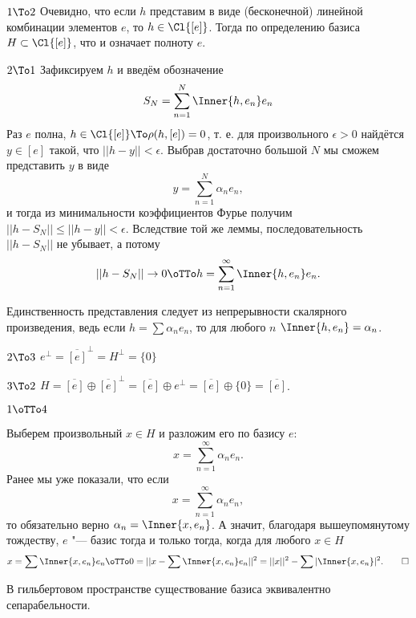 \documentclass[main]{subfiles}
\begin{document}
\begin{itemproof}
\item[\( 1 \To 2 \)]
  Очевидно, что если \( h \) представим в виде
  (бесконечной) линейной комбинации элементов \( e \), то
  \( h \in \Cl{[e]} \). Тогда по определению базиса
  \( H \subset \Cl{[e]} \), что и означает полноту \( e \).
\item[\( 2 \To 1 \)]
  Зафиксируем \( h \) и введём обозначение
  \[
    S_N = \sum_{n = 1}^N \Inner{h, e_n} e_n
  \]
  Раз \( e \) полна, \( h \in \Cl{[e]} \To \rho(h, [e]) = 0 \),
  т. е. для произвольного \( \epsilon > 0 \) найдётся
  \( y \in [e] \) такой, что \( ||h - y|| < \epsilon \).
  Выбрав достаточно большой \( N \) мы сможем представить
  \( y \) в виде
  \[
    y = \sum_{n=1}^N \alpha_n e_n,
  \]
  и тогда из минимальности коэффициентов Фурье получим
  \( ||h - S_N|| \le ||h - y|| < \epsilon \).
  Вследствие той же леммы, последовательность
  \( ||h - S_N|| \)
  не убывает, а потому
  \[
    ||h - S_N|| \to 0 \oTTo h = \sum_{n = 1}^\infty \Inner{h, e_n} e_n.
  \]

  Единственность представления следует из непрерывности
  скалярного произведения, ведь если 
  \( h = \sum \alpha_n e_n \), то для любого \( n \)
  \( \Inner{h, e_n} = \alpha_n  \).
\item[\( 2 \To 3 \)] \( e^\perp = \overline{[e]}^\perp = H^\perp = \{ 0 \} \)
\item[\( 3 \To 2 \)] \( H = \overline{[e]} \oplus \overline{[e]}^\perp =
  \overline{[e]} \oplus e^\perp = \overline{[e]} \oplus \{ 0 \} = \overline{[e]} \).

\item[\( 1 \oTTo 4 \)]

  Выберем произвольный \( x \in H \) и разложим его по базису \( e \):
  \[
    x = \sum_{n=1}^\infty \alpha_n e_n.
  \]
  Ранее мы уже показали, что если
  \[
    x = \sum_{n=1}^\infty \alpha_n e_n,
  \]
  то обязательно верно \( \alpha_n = \Inner{x, e_n} \).
  А значит, благодаря вышеупомянутому тождеству,
  \( e \) "--- базис тогда и только тогда, когда
  для любого \( x \in H \)
  \[
    x = \sum \Inner{x, e_n} e_n
    \oTTo 
    0 = ||x - \sum \Inner{x, e_n} e_n||^2 =
    ||x||^2 - \sum |\Inner{x, e_n}|^2. \qedhere
  \]
\end{itemproof}

\begin{theorem*}
  В гильбертовом пространстве
  существование базиса эквивалентно сепарабельности.
\end{theorem*}
\end{document}
